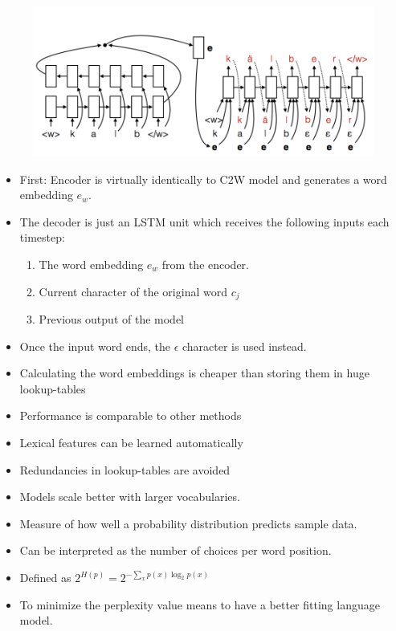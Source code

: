 \documentclass[11pt, a4paper, landscape]{article}
\begin{document}
\begin{figure}[H]
\begin{center}
  \includegraphics[width=.6\linewidth]{../article/img/inflection-generation}
\end{center}
\end{figure}
\begin{itemize}
\item First: Encoder is virtually identically to C2W model and generates a word embedding $e_{w}$.
\item The decoder is just an LSTM unit which receives the following inputs each timestep:
  \begin{enumerate}
    \item The word embedding $e_{w}$ from the encoder.
    \item Current character of the original word $c_j$
    \item Previous output of the model
  \end{enumerate}
\item Once the input word ends, the  $\epsilon$ character is used instead.
\end{itemize}

\NewPage{}

\vfill
\begin{itemize}
\item Calculating the word embeddings is cheaper than storing them in huge lookup-tables
\item Performance is comparable to other methods
\item Lexical features can be learned automatically
\item Redundancies in lookup-tables are avoided
\item Models scale better with larger vocabularies.
\end{itemize}
\vfill


\NewPage{}

\vfill
\begin{itemize}
\item Measure of how well a probability distribution predicts sample data.
\item Can be interpreted as the number of choices per word position.
\item Defined as $2^{H(p)}=2^{-\sum_x p(x)\log_2 p(x)}$
\item To minimize the perplexity value means to have a better fitting language model.
\end{itemize}
\vfill
\end{document}
